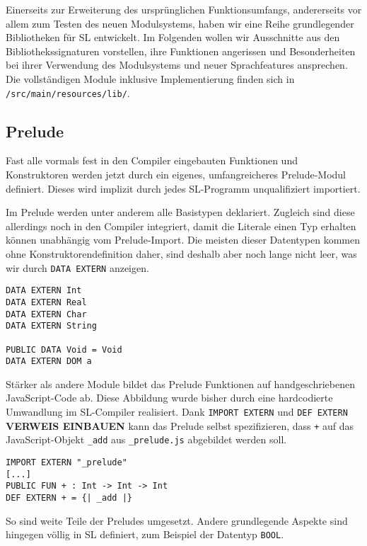 \documentclass[runningheads]{llncs}
\begin{document}
Einerseits zur Erweiterung des ursprünglichen Funktionsumfangs, andererseits
vor allem zum Testen des neuen Modulsystems, haben wir eine Reihe grundlegender
Bibliotheken für SL entwickelt. Im Folgenden wollen wir Ausschnitte aus den
Bibliothekssignaturen vorstellen, ihre Funktionen angerissen und
Besonderheiten bei ihrer Verwendung des Modulsystems und neuer Sprachfeatures
ansprechen. Die vollständigen Module inklusive Implementierung finden sich
in \verb|/src/main/resources/lib/|.

\subsection{Prelude}
\label{sec:libsPrelude}

Fast alle vormals fest in den Compiler eingebauten Funktionen und Konstruktoren
werden jetzt durch ein eigenes, umfangreicheres Prelude-Modul definiert.
Dieses wird implizit durch jedes SL-Programm unqualifiziert importiert.

Im Prelude werden unter anderem alle Basistypen deklariert. Zugleich sind
diese allerdings noch in den Compiler integriert, damit die Literale einen
Typ erhalten können unabhängig vom Prelude-Import. Die meisten dieser
Datentypen kommen ohne Konstruktorendefinition daher, sind deshalb aber noch
lange nicht leer, was wir durch \verb|DATA EXTERN| anzeigen.

\begin{verbatim}
DATA EXTERN Int
DATA EXTERN Real
DATA EXTERN Char
DATA EXTERN String

PUBLIC DATA Void = Void
DATA EXTERN DOM a
\end{verbatim}

Stärker als andere Module bildet das Prelude Funktionen auf handgeschriebenen
JavaScript-Code ab. Diese Abbildung wurde bisher durch eine hardcodierte
Umwandlung im SL-Compiler realisiert. Dank \verb|IMPORT EXTERN| und
\verb|DEF EXTERN| \textbf{VERWEIS EINBAUEN} kann das Prelude selbst
spezifizieren, dass \verb|+| auf das JavaScript-Objekt \verb|_add|
aus \verb|_prelude.js| abgebildet werden soll.

\begin{verbatim}
IMPORT EXTERN "_prelude" 
[...]
PUBLIC FUN + : Int -> Int -> Int
DEF EXTERN + = {| _add |}
\end{verbatim}

So sind weite Teile der Preludes umgesetzt. Andere grundlegende Aspekte
sind hingegen völlig in SL definiert, zum Beispiel der Datentyp \verb|BOOL|.
\end{document}
